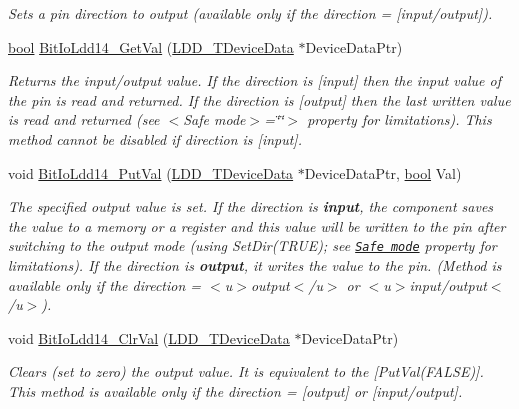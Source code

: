 \begin{DoxyCompactItemize}
\begin{DoxyCompactList}\small\item\em Sets a pin direction to output (available only if the direction = {\itshape \mbox{[}input/output\mbox{]}}). \end{DoxyCompactList}\item 
\hyperlink{group___p_e___types__module_ga97a80ca1602ebf2303258971a2c938e2}{bool} \hyperlink{group___bit_io_ldd14__module_gaafad119c3f5eaac56fbe423465ad25de}{Bit\+Io\+Ldd14\+\_\+\+Get\+Val} (\hyperlink{group___p_e___types__module_gac5cf1362f1f0e3a2ce71b1bf2276d091}{L\+D\+D\+\_\+\+T\+Device\+Data} $\ast$Device\+Data\+Ptr)
\begin{DoxyCompactList}\small\item\em Returns the input/output value. If the direction is \mbox{[}input\mbox{]} then the input value of the pin is read and returned. If the direction is \mbox{[}output\mbox{]} then the last written value is read and returned (see $<$\+Safe mode$>$=\char`\"{}\char`\"{}$>$ property for limitations). This method cannot be disabled if direction is \mbox{[}input\mbox{]}. \end{DoxyCompactList}\item 
void \hyperlink{group___bit_io_ldd14__module_ga5b43e570ab8bb71e3fb5dcbfdfb5f5f6}{Bit\+Io\+Ldd14\+\_\+\+Put\+Val} (\hyperlink{group___p_e___types__module_gac5cf1362f1f0e3a2ce71b1bf2276d091}{L\+D\+D\+\_\+\+T\+Device\+Data} $\ast$Device\+Data\+Ptr, \hyperlink{group___p_e___types__module_ga97a80ca1602ebf2303258971a2c938e2}{bool} Val)
\begin{DoxyCompactList}\small\item\em The specified output value is set. If the direction is {\bfseries  input}, the component saves the value to a memory or a register and this value will be written to the pin after switching to the output mode (using {\ttfamily Set\+Dir(\+T\+R\+U\+E)}; see \href{BitIOProperties.html#SafeMode}{\tt Safe mode} property for limitations). If the direction is {\bfseries output}, it writes the value to the pin. (Method is available only if the direction = $<$u$>${\ttfamily output}$<$/u$>$ or $<$u$>${\ttfamily  input/output}$<$/u$>$). \end{DoxyCompactList}\item 
void \hyperlink{group___bit_io_ldd14__module_ga3525e52f161a7a507fa5cbb80ddc5c60}{Bit\+Io\+Ldd14\+\_\+\+Clr\+Val} (\hyperlink{group___p_e___types__module_gac5cf1362f1f0e3a2ce71b1bf2276d091}{L\+D\+D\+\_\+\+T\+Device\+Data} $\ast$Device\+Data\+Ptr)
\begin{DoxyCompactList}\small\item\em Clears (set to zero) the output value. It is equivalent to the \mbox{[}Put\+Val(\+F\+A\+L\+S\+E)\mbox{]}. This method is available only if the direction = {\itshape \mbox{[}output\mbox{]}} or {\itshape \mbox{[}input/output\mbox{]}}. \end{DoxyCompactList}\item 

\end{DoxyCompactItemize}
